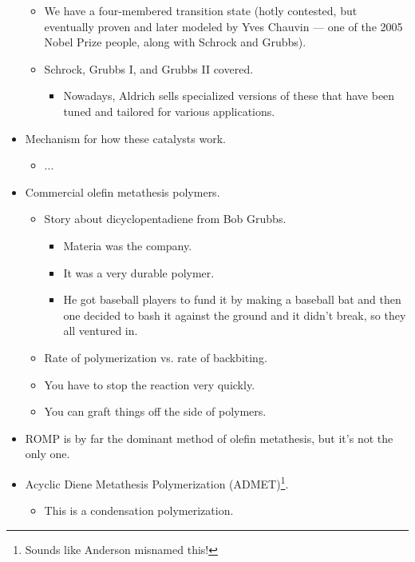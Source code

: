 \documentclass[../notes.tex]{subfiles}
\begin{document}
\begin{itemize}
\begin{itemize}
        \item We have a four-membered transition state (hotly contested, but eventually proven and later modeled by Yves Chauvin --- one of the 2005 Nobel Prize people, along with Schrock and Grubbs).
        \item Schrock, Grubbs I, and Grubbs II covered.
        \begin{itemize}
            \item Nowadays, Aldrich sells specialized versions of these that have been tuned and tailored for various applications.
        \end{itemize}
    \end{itemize}
    \item Mechanism for how these catalysts work.
    \begin{itemize}
        \item ...
    \end{itemize}
    \item Commercial olefin metathesis polymers.
    \begin{itemize}
        \item Story about dicyclopentadiene from Bob Grubbs.
        \begin{itemize}
            \item Materia was the company.
            \item It was a very durable polymer.
            \item He got baseball players to fund it by making a baseball bat and then one decided to bash it against the ground and it didn't break, so they all ventured in.
        \end{itemize}
        \item Rate of polymerization vs. rate of backbiting.
        \item You have to stop the reaction very quickly.
        \item You can graft things off the side of polymers.
    \end{itemize}
    \item ROMP is by far the dominant method of olefin metathesis, but it's not the only one.
    \item Acyclic Diene Metathesis Polymerization (ADMET)\footnote{Sounds like Anderson misnamed this!}.
    \begin{itemize}
        \item This is a condensation polymerization.
    \end{itemize}
\end{itemize}
\end{document}

